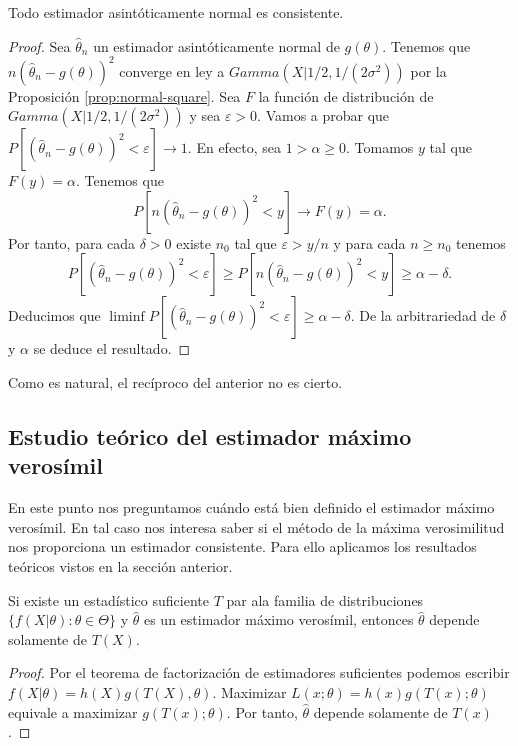 \documentclass{article}
\begin{document}
    \begin{prop}
        Todo estimador asintóticamente normal es consistente.
    \end{prop}
    \begin{proof}
        Sea $\hat\theta_n$ un estimador asintóticamente normal de $g(\theta)$. Tenemos que $n (\hat\theta_n - g(\theta))^2$ converge en ley a $Gamma(X|1/2, 1/(2\sigma^2))$ por la Proposición \ref{prop:normal-square}. Sea $F$ la función de distribución de $Gamma(X|1/2, 1/(2\sigma^2))$ y sea $\varepsilon > 0$. Vamos a probar que $P[(\hat\theta_n - g(\theta))^2 < \varepsilon] \to 1$. En efecto, sea $1 > \alpha \ge 0$. Tomamos $y$ tal que $F(y) = \alpha$. Tenemos que
        \[P[n(\hat\theta_n - g(\theta))^2 < y] \to F(y) = \alpha.\]
        Por tanto, para cada $\delta > 0$ existe $n_0$ tal que $\varepsilon > y /n$ y para cada $n \ge n_0$ tenemos
        \[P[(\hat\theta_n - g(\theta))^2 < \varepsilon] \ge P[n(\hat\theta_n - g(\theta))^2 < y] \ge \alpha - \delta.\]
        Deducimos que $\liminf P[(\hat\theta_n - g(\theta))^2 < \varepsilon] \ge \alpha - \delta.$ De la arbitrariedad de $\delta$ y $\alpha$ se deduce el resultado.
    \end{proof}

    Como es natural, el recíproco del anterior no es cierto.

    \subsection{Estudio teórico del estimador máximo verosímil}

    En este punto nos preguntamos cuándo está bien definido el estimador máximo verosímil. En tal caso nos interesa saber si el método de la máxima verosimilitud nos proporciona un estimador consistente. Para ello aplicamos los resultados teóricos vistos en la sección anterior.

    \begin{prop}
        Si existe un estadístico suficiente $T$ par ala familia de distribuciones $\{f(X|\theta): \theta \in \Theta\}$ y $\hat\theta$ es un estimador máximo verosímil, entonces $\hat\theta$ depende solamente de $T(X)$.
    \end{prop}
    \begin{proof}
        Por el teorema de factorización de estimadores suficientes podemos escribir $f(X|\theta) = h(X) g(T(X), \theta)$. Maximizar $L(x; \theta) = h(x) g(T(x); \theta)$ equivale a maximizar $g(T(x); \theta)$. Por tanto, $\hat\theta$ depende solamente de $T(x)$.
    \end{proof}
\end{document}
